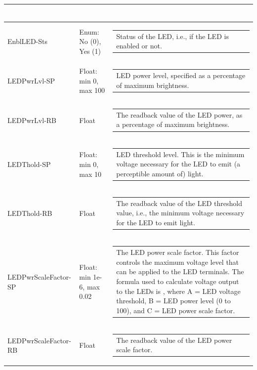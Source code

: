 \documentclass[openany]{article}
\begin{document}
\begin{longtable}{| m{4.5cm} m{2.5cm}  m{7.0cm} |}
\begin{tabular}{@{}m{6cm}@{}}
            \end{tabular} \hypertarget{}{}\\ \hline
        EnblLED-Sts & Enum: No (0), Yes (1) & \begin{tabular}{@{}m{6cm}@{}}
                Status of the LED, i.e., if the LED is enabled or not.
            \end{tabular} \hypertarget{pv:led-pwr-lvl}{}\\ \hline
        LEDPwrLvl-SP & Float: min 0, max 100 & \begin{tabular}{@{}m{6cm}@{}}
                LED power level, specified as a percentage of maximum brightness.
            \end{tabular} \hypertarget{}{}\\ \hline
        LEDPwrLvl-RB & Float & \begin{tabular}{@{}m{6cm}@{}}
                The readback value of the LED power, as a percentage of maximum brightness.
            \end{tabular} \hypertarget{pv:led-thold}{}\\ \hline
        LEDThold-SP & Float: min 0, max 10 & \begin{tabular}{@{}m{6cm}@{}}
                LED threshold level. This is the minimum voltage necessary for the LED to emit (a perceptible amount of) light.
            \end{tabular} \hypertarget{}{}\\ \hline
        LEDThold-RB & Float & \begin{tabular}{@{}m{6cm}@{}}
                The readback value of the LED threshold value, i.e., the minimum voltage necessary for the LED to emit light.
            \end{tabular} \hypertarget{pv:led-pwr-scale-factor}{}\\ \hline
        LEDPwrScaleFactor-SP & Float: min 1e-6, max 0.02 & \begin{tabular}{@{}m{6cm}@{}}
                The LED power scale factor. This factor controls the maximum voltage level that can be applied to the LED terminals. The formula used to calculate voltage output to the LEDs is $A.e^{B.C}$, where A = LED voltage threshold, B = LED power level (0 to 100), and C = LED power scale factor.
            \end{tabular} \hypertarget{}{}\\ \hline
        LEDPwrScaleFactor-RB & Float & \begin{tabular}{@{}m{6cm}@{}}
                The readback value of the LED power scale factor.
            \end{tabular} \hypertarget{}{}\\ \hline
    \end{longtable}
\end{document}
